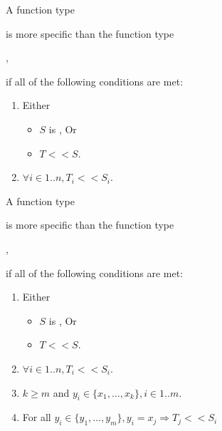 \documentclass[makeidx]{article}
\begin{document}
{\LMHash{}%
A function type



\noindent
is more specific than the function type


,

\noindent
if all of the following conditions are met:
\begin{enumerate}
\item Either
\begin{itemize}
\item $S$ is \VOID{}, Or
\item $T << S$.
\end{itemize}
\item $\forall i \in 1 .. n, T_i << S_i$.
\end{enumerate}

\LMHash{}%
A function type



\noindent
is more specific than the function type


,

\noindent
if all of the following conditions are met:
\begin{enumerate}
\item Either
\begin{itemize}
\item $S$ is \VOID{}, Or
\item $T << S$.
\end{itemize}
\item $\forall i \in 1 .. n, T_i << S_i$.
\item $k \ge m$ and $y_i \in \{x_1, \ldots, x_k\}, i \in 1 .. m$.
\item For all $y_i \in \{y_1, \ldots, y_m\}, y_i = x_j \Rightarrow T_j << S_i$
\end{enumerate}

}
\end{document}
